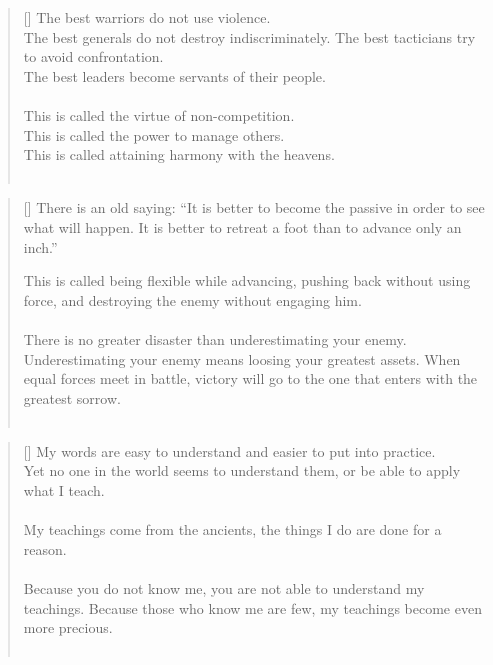 \documentclass{article}
\begin{document}
\settowidth{\versewidth}{The Wizard leads byemptying people’s minds, filling their bellies, weakening their am- bitions, and making them become strong}
\begin{verse}[\versewidth]
The best warriors do not use violence.\\
The best generals do not destroy indiscriminately. 
The best tacticians try to avoid confrontation.\\
The best leaders become servants of their people.\\
\hfill\\
This is called the virtue of non-competition.\\
This is called the power to manage others.\\
This is called attaining harmony with the heavens.\\
\hfill\\
\end{verse}

\settowidth{\versewidth}{The Wizard leads byemptying people’s minds, filling their bellies, weakening their am- bitions, and making them become strong}
\begin{verse}[\versewidth]
There is an old saying:
``It is better to become the passive in order to see what will happen. It is better to retreat a foot than to advance only an inch.''

This is called being flexible while advancing, pushing back without using force, and destroying the enemy without engaging him.\\
\hfill\\
There is no greater disaster than underestimating your enemy. Underestimating your enemy means loosing your greatest assets. 
When equal forces meet in battle, victory will go to the one that enters with the greatest sorrow.\\
\hfill\\
\end{verse}

\settowidth{\versewidth}{The Wizard leads byemptying people’s minds, filling their bellies, weakening their am- bitions, and making them become strong}
\begin{verse}[\versewidth]
My words are easy to understand and easier to put into practice.\\
Yet no one in the world seems to understand them, or be able to apply what I teach.\\
\hfill\\
My teachings come from the ancients, the things I do are done for a reason.\\
\hfill\\
Because you do not know me, you are not able to understand my teachings. 
Because those who know me are few, my teachings become even more precious.\\
\hfill\\
\end{verse}
\end{document}
